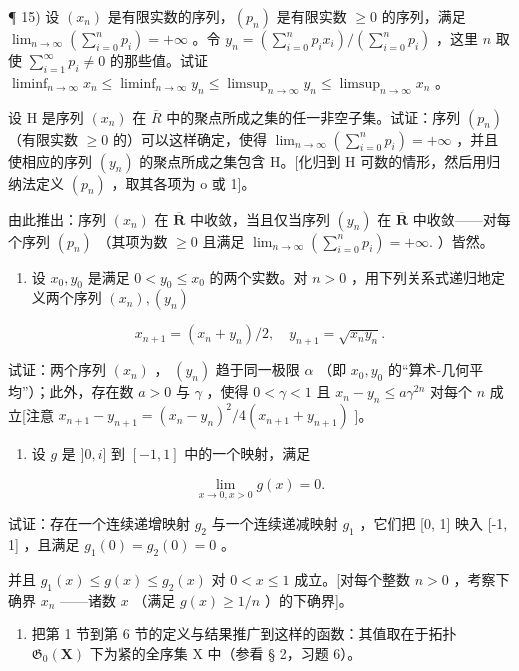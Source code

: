 ¶ 15) 设 \((x_n)\) 是有限实数的序列，\((p_n)\) 是有限实数 \(\geqslant 0\) 的序列，满足 \(\lim_{n\to \infty}\left(\sum_{i=0}^{n}p_i\right) = +\infty\) 。令 \(y_n = \left(\sum_{i=0}^{n}p_ix_i\right) / \left(\sum_{i=0}^{n}p_i\right)\) ，这里 \(n\) 取使 \(\sum_{i=1}^{\infty}p_i \neq 0\) 的那些值。试证 \(\liminf_{n\to \infty}x_n \leqslant \liminf_{n\to \infty}y_n \leqslant \limsup_{n\to \infty}y_n \leqslant \limsup_{n\to \infty}x_n\) 。

设 H 是序列 \((x_{n})\) 在 \(\overline{R}\) 中的聚点所成之集的任一非空子集。试证：序列 \((p_{n})\) （有限实数 \(\geqslant0\) 的）可以这样确定，使得 \(\lim_{n\to\infty}\left(\sum_{i=0}^{n}p_{i}\right)=+\infty\) ，并且使相应的序列 \((y_{n})\) 的聚点所成之集包含 H。{[}化归到 H 可数的情形，然后用归纳法定义 \((p_{n})\) ，取其各项为 o 或 1{]}。

由此推出：序列 \((x_{n})\) 在 \(\overline{\mathbf{R}}\) 中收敛，当且仅当序列 \((y_{n})\) 在 \(\overline{\mathbf{R}}\) 中收敛——对每个序列 \((p_n)\) （其项为数 \(\geqslant 0\) 且满足 \(\lim_{n\to \infty}\left(\sum_{i = 0}^{n}p_i\right) = +\infty .\) ）皆然。

\begin{enumerate}
\def\labelenumi{\arabic{enumi})}
\setcounter{enumi}{15}
\tightlist
\item
设 \(x_0, y_0\) 是满足 \(0 < y_0 \leqslant x_0\) 的两个实数。对 \(n > 0\) ，用下列关系式递归地定义两个序列 \((x_n), (y_n)\)
\end{enumerate}

\[
x _ {n + 1} = \left(x _ {n} + y _ {n}\right) / 2, \quad y _ {n + 1} = \sqrt {x _ {n} y _ {n}}.
\]

试证：两个序列 \((x_{n})\) ， \((y_{n})\) 趋于同一极限 \(\alpha\) （即 \(x_{0}, y_{0}\) 的``算术-几何平均''）；此外，存在数 \(a > 0\) 与 \(\gamma\) ，使得 \(0 < \gamma < 1\) 且 \(x_{n} - y_{n} \leqslant a\gamma^{2n}\) 对每个 \(n\) 成立{[}注意 \(x_{n+1} - y_{n+1} = (x_{n} - y_{n})^{2}/4(x_{n+1} + y_{n+1})\) {]}。

\begin{enumerate}
\def\labelenumi{\arabic{enumi})}
\setcounter{enumi}{16}
\tightlist
\item
设 \(g\) 是 \(]0, i]\) 到 \([-1, 1]\) 中的一个映射，满足
\end{enumerate}

\[
\lim _ {x \rightarrow 0, x > 0} g (x) = 0.
\]

试证：存在一个连续递增映射 \(g_{2}\) 与一个连续递减映射 \(g_{1}\) ，它们把 {[}0, 1{]} 映入 {[}-1, 1{]} ，且满足 \(g_{1}(0) = g_{2}(0) = 0\) 。

并且 \(g_{1}(x) \leqslant g(x) \leqslant g_{2}(x)\) 对 \(0 < x \leqslant 1\) 成立。{[}对每个整数 \(n > 0\) ，考察下确界 \(x_{n}\) ——诸数 \(x\) （满足 \(g(x) \geqslant 1 / n\) ）的下确界{]}。

\begin{enumerate}
\def\labelenumi{\arabic{enumi})}
\setcounter{enumi}{17}
\tightlist
\item
把第 1 节到第 6 节的定义与结果推广到这样的函数：其值取在于拓扑 \(\mathfrak{G}_{0}(\mathbf{X})\) 下为紧的全序集 X 中（参看 § 2，习题 6）。
\end{enumerate}

